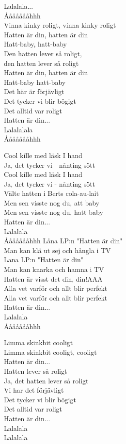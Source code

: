 \vspace{10pt}
Lalalala...\\
Åååååååhhh\\
Vinna kinky roligt, vinna kinky roligt\\
Hatten är din, hatten är din\\
Hatt-baby, hatt-baby\\
Den hatten lever så roligt,\\
den hatten lever så roligt\\
Hatten är din, hatten är din\\
Hatt-baby hatt-baby\\
Det här är förjävligt\\
Det tycker vi blir bögigt\\
Det alltid var roligt\\
\revrpt Hatten är din...\rpt\\
Lalalalala\\
Åååååååhhh\par
\vspace{10pt}
Cool kille med läsk I hand\\
Ja, det tycker vi - nånting sött\\
Cool kille med läsk I hand\\
Ja, det tycker vi - nånting sött\\
\revrpt Välte hatten i Berts cola-au-lait\rpt \\
\revrpt Men sen visste nog du, att baby\rpt \\
\revrpt Men sen visste nog du, hatt baby\rpt \\
Hatten är din...\\
Lalalala\\
Åååååååhhh
\newpage
Låna LP:n "Hatten är din"\\
Man kan klä ut sej och hångla i TV\\
Lana LP:n "Hatten är din"\\
Man kan knarka och hamna i TV\\
\revrpt Hatten är visst det din, din!AAA\rpt \\
\revrpt Alla vet varför och allt blir perfekt \\
Alla vet varför och allt blir perfekt\rpt \\
Hatten är din... \\
Lalalala\\
Åååååååhhh\par
\vspace{10pt}
Limma skinkbit cooligt\\
Limma skinkbit cooligt, cooligt\\
Hatten är din...\\
\revrpt Hatten lever så roligt\rpt \\
Ja, det hatten lever så roligt\\
Vi har det förjävligt\\
Det tycker vi blir bögigt\\
Det alltid var roligt\\
\revrpt Hatten är din...\rpt \\
Lalalala\\
Lalalala
